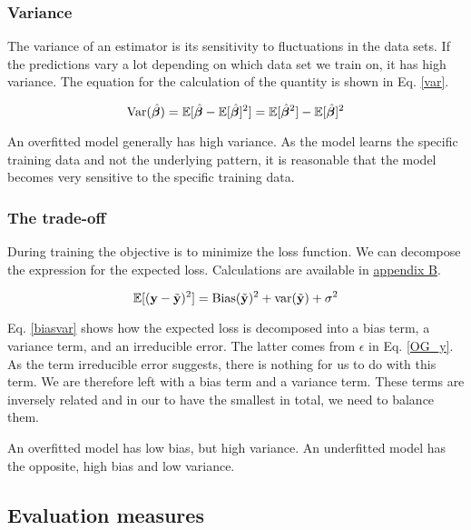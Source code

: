 \subsubsection{Variance}

The variance of an estimator is its sensitivity to fluctuations in the data sets. If the predictions vary a lot depending on which data set we train on, it has high variance. The equation for the calculation of the quantity is shown in Eq. \ref{var}. 

\begin{equation}\label{var}
    \text{Var}(\hat{\boldsymbol{\beta}}) = \mathbb{E}[\hat{\boldsymbol{\beta}}-\mathbb{E}[\hat{\boldsymbol{\beta}}]^2] = \mathbb{E}[\hat{\boldsymbol{\beta}}^2] - \mathbb{E}[\hat{\boldsymbol{\beta}}]^2
\end{equation}

An overfitted model generally has high variance.  As the model learns the specific training data and not the underlying pattern, it is reasonable that the model becomes very sensitive to the specific training data. 

\subsubsection{The trade-off}


During training the objective is to minimize the loss function.  We can decompose the expression for the expected loss. Calculations are available in \hyperref[appendixB]{appendix B}.

\begin{equation}\label{biasvar}
    \mathbb{E}[(\mathbf{y} - \Tilde{\mathbf{y}})^2] = \text{Bias}(\Tilde{\mathbf{y}})^2 + \text{var}(\Tilde{\mathbf{y}}) + \sigma^2
\end{equation}

Eq. \ref{biasvar} shows how the expected loss is decomposed into a bias term, a variance term, and an irreducible error. The latter comes from $\epsilon$ in Eq. \ref{OG_y}. As the term irreducible error suggests, there is nothing for us to do with this term. We are therefore left with a bias term and a variance term. These terms are inversely related and in our to have the smallest  in total, we need to balance them. 

An overfitted model has low bias, but high variance. An underfitted model has the opposite, high bias and low variance. 






\subsection{Evaluation measures}


